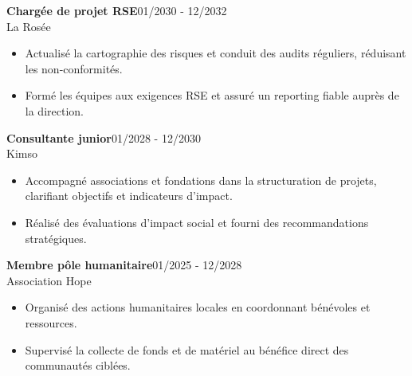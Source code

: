 \documentclass[a4paper]{article}
\renewcommand{\colorbox}[2]{#2}%
\begin{document}
\vspace{3mm}

\colorbox{maincolor}{%
  \begin{minipage}{\linewidth}
    \noindent
    \textbf{Chargée de projet RSE}\hfill 01/2030 - 12/2032\\
    La Rosée\\[-0.3em]
    \begin{itemize}[leftmargin=*]
      \item Actualisé la cartographie des risques et conduit des audits réguliers, réduisant les non-conformités. \item Formé les équipes aux exigences RSE et assuré un reporting fiable auprès de la direction.
    \end{itemize}
  \end{minipage}}

\vspace{3mm}

\colorbox{maincolor}{%
  \begin{minipage}{\linewidth}
    \noindent
    \textbf{Consultante junior}\hfill 01/2028 - 12/2030\\
    Kimso\\[-0.3em]
    \begin{itemize}[leftmargin=*]
      \item Accompagné associations et fondations dans la structuration de projets, clarifiant objectifs et indicateurs d’impact. \item Réalisé des évaluations d’impact social et fourni des recommandations stratégiques.
    \end{itemize}
  \end{minipage}}

\vspace{3mm}

\colorbox{maincolor}{%
  \begin{minipage}{\linewidth}
    \noindent
    \textbf{Membre pôle humanitaire}\hfill 01/2025 - 12/2028\\
    Association Hope\\[-0.3em]
    \begin{itemize}[leftmargin=*]
      \item Organisé des actions humanitaires locales en coordonnant bénévoles et ressources. \item Supervisé la collecte de fonds et de matériel au bénéfice direct des communautés ciblées.
    \end{itemize}
  \end{minipage}}
\end{document}
